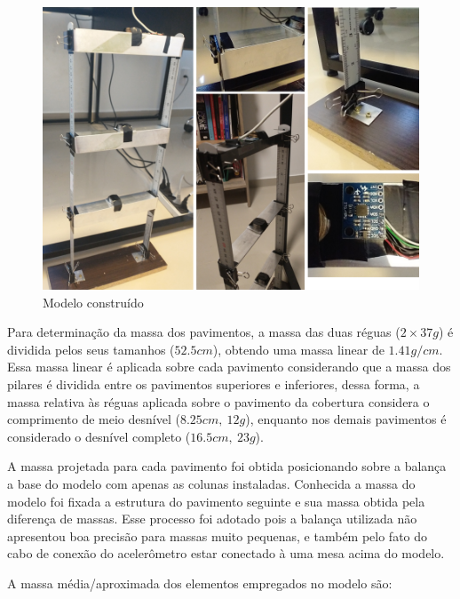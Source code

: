 \begin{figure}
\centering
\includegraphics{../images/colagem.png}
\caption{Modelo construído}
\end{figure}

Para determinação da massa dos pavimentos, a massa das duas réguas
(\(2\times37g\)) é dividida pelos seus tamanhos (\(52.5cm\)), obtendo
uma massa linear de \(1.41 g/cm\). Essa massa linear é aplicada sobre
cada pavimento considerando que a massa dos pilares é dividida entre os
pavimentos superiores e inferiores, dessa forma, a massa relativa às
réguas aplicada sobre o pavimento da cobertura considera o comprimento
de meio desnível (\(8.25cm, ~12g\)), enquanto nos demais pavimentos é
considerado o desnível completo (\(16.5cm, ~23g\)).

A massa projetada para cada pavimento foi obtida posicionando sobre a
balança a base do modelo com apenas as colunas instaladas. Conhecida a
massa do modelo foi fixada a estrutura do pavimento seguinte e sua massa
obtida pela diferença de massas. Esse processo foi adotado pois a
balança utilizada não apresentou boa precisão para massas muito
pequenas, e também pelo fato do cabo de conexão do acelerômetro estar
conectado à uma mesa acima do modelo.

A massa média/aproximada dos elementos empregados no modelo são:

